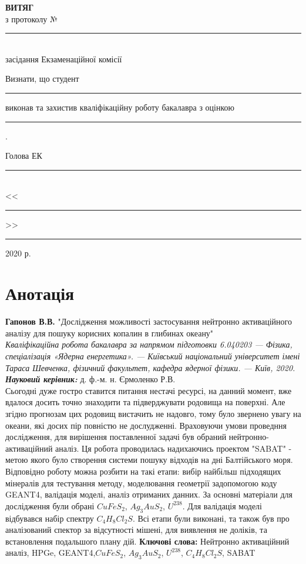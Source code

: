 \documentclass[a4paper, 14pt]{article}
\numberwithin{equation}{section}
\numberwithin{table}{section}
\begin{document}
\begin{titlepage}
\renewcommand{\baselinestretch}{1.0}
\newcommand{\ul}[1]{\rule{#1}{0.1pt}}
	\begin{spacing}{1.8}
		\vspace*{4.5cm}
		{\center
		{\bf ВИТЯГ}\\
		з протоколу № \ul{2.4cm}\\
		засідання Екзаменаційної комісії\\[2cm]}
		{\noindent
		Визнати, що студент \ul{7.2cm} виконав та захистив кваліфікаційну роботу бакалавра з оцінкою \ul{7.2cm} .\\[1cm]}
		{\flushright
		Голова ЕК \ul{7.8cm}\\
		<<\ul{1cm}>> \ul{4cm} 2020 р.\\}
	\end{spacing}
\end{titlepage}


\pagestyle{empty}

\section*{Анотація}

{\bf Гапонов В.В.} "Дослідження можливості застосування нейтронно активаційного аналізу для пошуку корисних копалин в глибинах океану"\\
{\itshape Кваліфікаційна робота бакалавра за напрямом підготовки 6.040203 --- Фізика, спеціалізація «Ядерна енергетика». --- Київський національний університет імені Тараса Шевченка, фізичний факультет, кафедра ядерної фізики. --- Київ, 2020.} \\
{\itshape \bfseries Науковий керівник:} д. ф.-м. н. Єрмоленко Р.В.%
\\[0.5cm]
  Сьогодні дуже гостро ставится питання нестачі ресурсі, на данний момент, вже вдалося досить точно знаходити та підверджувати родовища на поверхні. Але згідно прогнозам цих родовищ вистачить не надовго, тому було звернено увагу на океани, які досих пір повністю не дослудженні. 
  Враховуючи умови проведння дослідження, для вирішення поставленної задачі був обраний нейтронно-активаційний аналіз. Ця робота проводилась надихаючись проектом "SABAT" - метою якого було створення системи пошуку відходів на дні Балтійського моря. Відповідно роботу можна розбити на такі етапи: вибір найбільш підходящих мінералів для тестування методу, моделювання геометрії задопомогою коду GEANT4, валідація моделі, аналіз отриманих данних. За основні матеріали для дослідження були обрані $CuFeS_2$, $Ag_3AuS_2$, $U^{238}$. 
  Для валідація моделі відбувався набір спектру $C_4H_8Cl_2S$.
  Всі етапи були виконані, та також був про аналізований спектор за відсутності мішені, для виявлення не доліків, та встановлення подальшого плану дій. 
{\bf Ключові слова:} Нейтронно активаційний аналіз, HPGe, GEANT4,$CuFeS_2$, $Ag_3AuS_2$, $U^{238}$, $C_4H_8Cl_2S$, SABAT
\end{document}
